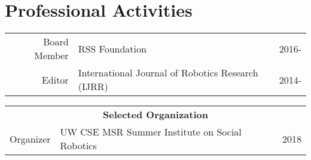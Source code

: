 \documentclass[10pt]{article}
\begin{document}
\section{Professional Activities}
\begin{tabularx}{\linewidth}{rXr}
Board Member & RSS Foundation & 2016-\\
Editor & International Journal of Robotics Research (IJRR) & 2014-\\
\end{tabularx}
\begin{tabularx}{\linewidth}{rXr}
\multicolumn{3}{c}{\textbf{Selected Organization}}\\
Organizer & UW CSE MSR Summer Institute on Social Robotics & 2018\\
\end{tabularx}
\end{document}
